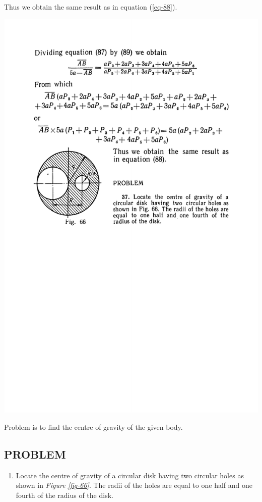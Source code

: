 \documentclass[a4paper,sfsidenotes]{tufte-book}
\begin{document}
Thus we obtain the same result as in equation (\ref{eq-88}).

\begin{marginfigure}[-3cm]	%
\centering
\includegraphics[width=0.8\linewidth]{fig-066a.pdf}
\caption{Problem is to find the centre of gravity of the given body.}
\label{fig-66}
\end{marginfigure}
\subsection{PROBLEM}
\begin{enumerate}[resume=problems]
\item Locate the centre of gravity of a circular disk having two circular holes as shown in \emph{Figure \ref{fig-66}}. The radii of the holes are equal to one half and one fourth of the radius of the disk.
\end{enumerate}

\cleardoublepage
\thispagestyle{empty}
\vspace*{2cm}
\end{document}
